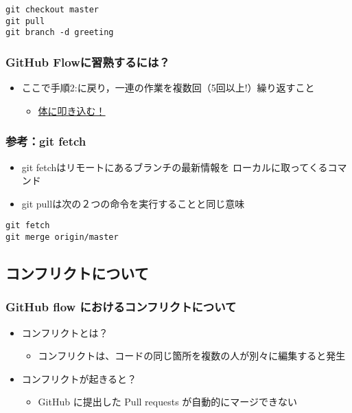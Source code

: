 \documentclass[a4paper,twoside,twocolumn]{bxjsarticle}
\begin{document}
\begin{verbatim}
git checkout master
git pull
git branch -d greeting
\end{verbatim}

\subsubsection{GitHub Flowに習熟するには？}
\label{sec-2-3-11}
\begin{itemize}
\item ここで手順2:に戻り，一連の作業を複数回（5回以上!）繰り返すこと
\begin{itemize}
\item \uline{体に叩き込む！}
\end{itemize}
\end{itemize}

\subsubsection{参考：git fetch}
\label{sec-2-3-12}
\begin{itemize}
\item git fetchはリモートにあるブランチの最新情報を
ローカルに取ってくるコマンド
\item git pullは次の２つの命令を実行することと同じ意味
\end{itemize}

\begin{verbatim}
git fetch
git merge origin/master
\end{verbatim}

\subsection{コンフリクトについて}
\label{sec-2-4}
\subsubsection{GitHub flow におけるコンフリクトについて}
\label{sec-2-4-1}
\begin{itemize}
\item コンフリクトとは？
\begin{itemize}
\item コンフリクトは、コードの同じ箇所を複数の人が別々に編集すると発生
\end{itemize}
\item コンフリクトが起きると？
\begin{itemize}
\item GitHub に提出した Pull requests が自動的にマージできない
\end{itemize}
\end{itemize}
\end{document}
